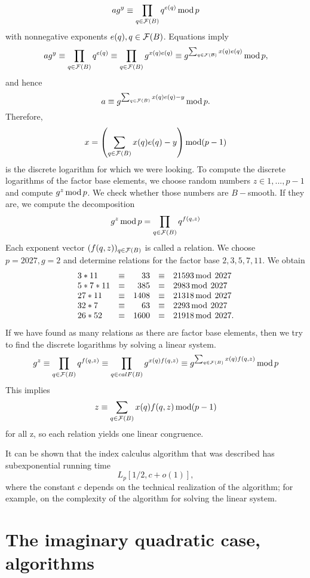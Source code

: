 \documentclass[12pt, letterpaper]{report}
\begin{document}
$$
ag^y \equiv \prod_{ q \in {\cal F}(B) }q^{e(q)}\mathop{\rm mod} p
$$
with nonnegative exponents $e(q), q \in {\cal F}(B)$. Equations imply
$$
ag^{y}\equiv \prod_{q\in {\cal F}(B)}q^{e(q)}\equiv \prod _{q\in {\cal F}(B)}g^{x(q)e(q)}\equiv g^{\sum_{q\in {\cal F(B)}}x(q)e(q)}\mathop{ \rm mod } p,
$$
and hence
$$
a \equiv g^{\sum_{ q\in {\cal F}(B)} x(q)e(q) - y}\mathop{ \rm mod } p.
$$
Therefore,
$$
x = \left(\sum_{q\in {\cal F}(B)} x(q)e(q) - y \right) \mathop{ \rm mod } (p - 1)
$$
is the discrete logarithm for which we were looking.
To compute the discrete logarithms of the factor base elements, we
choose random numbers $z\in {1,... ,p-1}$ and compute $g^z \mathop{\rm mod} p$. We check whether those numbers are
$B-$smooth. If they are, we compute the decomposition
$$
g^{z} \mathop{\rm mod} p= \prod_{q\in {\cal F}(B)}q^{f(q,z)}
$$
Each exponent vector $(f(q, z))_{q\in {\cal F}(B)}$ is called a relation.
We choose $p = 2027, g = 2$ and determine relations for the factor
base ${2, 3, 5, 7, 11}$. We obtain
$$
\begin{array}{lcrcl}
3*11 &\equiv & 33 &\equiv&  21593 \mathop{\rm mod}\: 2027\\
5*7*11 &\equiv & 385 &\equiv& 2983 \mathop{\rm mod}\: 2027\\
27*11 &\equiv & 1408 &\equiv & 21318 \mathop{\rm mod}\: 2027\\
32*7 &\equiv & 63 &\equiv & 2293 \mathop{\rm mod}\: 2027\\
26*52 &\equiv & 1600 &\equiv & 21918 \mathop{\rm mod}\: 2027.\\
\end{array}
$$
If we have found as many relations as there are factor base 
elements, then we try to find the discrete logarithms by solving a linear
system.
$$
g^{z}\equiv \prod_{q\in {\cal F}(B)}q^{f(q,z)}\equiv \prod_{q\in {cal F}(B)}g^{x(q) f(q,z)}\equiv g^{\sum_{q\in {\cal F}(B)}x(q)f(q,z)} \mathop{\rm mod} p
$$
This implies
$$
z \equiv \sum_{q\in {\cal F}(B)}x(q)f(q, z) \mathop{\rm mod} (p-1)
$$
for all z, so each relation yields one linear congruence.

It can be shown that the index calculus algorithm that was described has subexponential running time 
$$
L_{p}[1/2, c+o(1)],
$$
where the constant $c$ depends on the technical
realization of the algorithm; for example, on the complexity of the
algorithm for solving the linear system.

\section{The imaginary quadratic case, algorithms}
\end{document}
